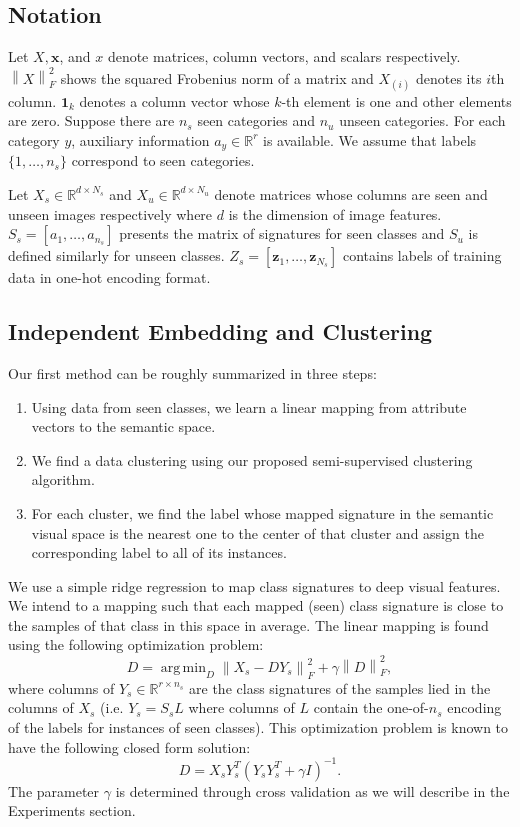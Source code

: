 \documentclass[10pt,twocolumn,letterpaper]{article}
\newcommand{\norm}[1]{\left \lVert #1 \right \rVert_{F}^2}
\DeclareMathOperator*{\argmin}{arg\,min}
\begin{document}
\subsection{Notation}
Let $X, \mathbf{x}$, and $x$ denote matrices, column vectors, and scalars respectively. $\norm{X}$ shows the squared Frobenius norm of a matrix and
$X_{(i)}$ denotes its $i$th column. $\mathbf{1}_k$ denotes a column vector whose $k$-th element is one and other elements are zero.
Suppose there are $n_s$ seen categories and $n_u$ unseen categories. For each category $y$,
auxiliary information $a_y \in \mathbb{R}^r$ is available. We assume that labels $\{1, \ldots, n_s \}$ correspond to seen categories.

Let $X_s \in \mathbb{R}^{d \times N_s}$ and $X_u \in \mathbb{R}^{d \times N_u}$
denote matrices whose columns are seen and unseen images respectively where $d$ is the dimension of image features.
$S_s = [a_1, \ldots, a_{n_s}]$ presents the matrix of signatures for seen classes and $S_u$ is defined similarly for unseen classes.
$Z_s = [ \mathbf{z}_1, \ldots, \mathbf{z}_{N_s} ]$
contains labels of training data in one-hot encoding format.

\subsection{Independent Embedding and Clustering} \label{clustering}
Our first method can be roughly summarized in three steps:
\begin{enumerate}
  \item
   Using data from seen classes, we learn a linear mapping from attribute vectors to the semantic space.
  \item We find a data clustering using our proposed semi-supervised clustering algorithm.
  \item For each cluster, we find the label whose mapped signature in the semantic visual space is the nearest one to the center of that cluster
   and assign the corresponding label to all of its instances.
\end{enumerate}
We use a simple ridge regression to map class signatures to deep visual features.
 We intend to a mapping such that each mapped (seen) class signature is close to the samples of that class in this space in average.
The linear mapping is found using the following optimization problem:
\begin{equation} \label{eq:mapping}
  D = \argmin_D \norm{X_s - D Y_s} + \gamma \norm{D},
\end{equation}
where columns of $ Y_s \in \mathbb{R}^{r \times n_s} $ are the class signatures of the samples lied in the columns of $X_s$ (i.e. $Y_s=S_sL$ where columns of $L$ contain the one-of-$n_s$ encoding of the labels for instances of seen classes).
This optimization problem is known to have the following closed form solution:
\begin{equation} \label{eq:dic}
  D = X_s Y_s^T (Y_s Y_s^T + \gamma I)^{-1}.
\end{equation}
The parameter $\gamma$ is determined through cross validation as we will describe in the Experiments section.
\end{document}
